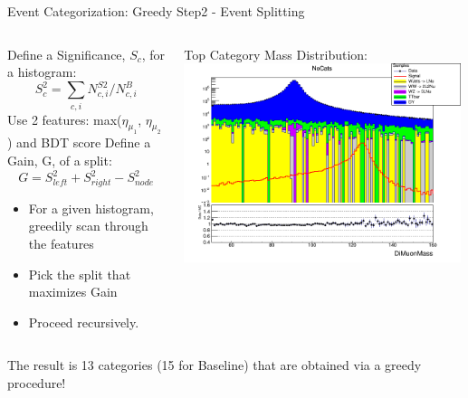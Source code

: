 \documentclass[pdf, 9pt]{beamer}
\begin{document}
  \begin{frame}{Event Categorization: Greedy Step2 - Event Splitting}
    \begin{columns}[T]
      \begin{column}{0.6\textwidth}
        Define a Significance, $S_c$, for a histogram:\\
        \begin{equation}
          {S^2_c} = \sum_{c,i}N^{S2}_{c,i}/N^{B}_{c,i}
          \label{eq:higgs_categorization_significance}
        \end{equation}
        Use 2 features: max($\eta_{\mu_1}$, $\eta_{\mu_2}$) and BDT score
        Define a Gain, G, of a split:
        \begin{equation}
          {G} = {S^2_{left}} + {S^2_{right}} - {S^2_{node}}
          \label{eq:higgs_categorization_gain}
        \end{equation}
        \begin{itemize}
          \item For a given histogram, greedily scan through the features\\
          \item Pick the split that maximizes Gain\\
          \item Proceed recursively.
        \end{itemize}
      \end{column}
      \begin{column}{0.4\textwidth}
        \alert{Top Category} Mass Distribution:\\\vspace{0.2cm}
        \includegraphics[width=0.99\textwidth, height=0.45\textheight]{figs/higgs/distributions/baseline_rochester/distribution__NoCats__DiMuonMass__logY.png}
      \end{column}
    \end{columns}
    \vspace{0.2cm}
    \alert{The result is 13 categories (15 for Baseline) that are obtained via a greedy procedure!}
  \end{frame}
\end{document}
